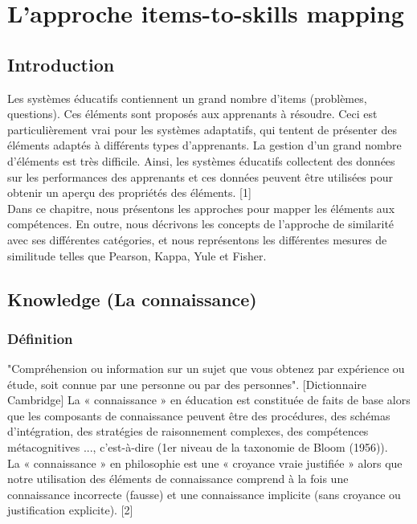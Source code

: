\chapter{L'approche items-to-skills mapping} 
\minitoc
\thispagestyle{empty}
\newpage
\section{Introduction}
Les systèmes éducatifs contiennent un grand nombre d'items (problèmes, questions). Ces éléments sont proposés aux apprenants à résoudre. Ceci est particulièrement vrai pour les systèmes adaptatifs, qui tentent de présenter des éléments adaptés à différents types d'apprenants. La gestion d’un grand nombre d’éléments est très difficile. Ainsi, les systèmes éducatifs collectent des données sur les performances des apprenants et ces données peuvent être utilisées pour obtenir un aperçu des propriétés des éléments. [1] \\
Dans ce chapitre, nous présentons les approches pour mapper les éléments aux compétences. En outre, nous décrivons les concepts de l'approche de similarité avec ses différentes catégories, et nous représentons les différentes mesures de similitude telles que Pearson, Kappa, Yule et Fisher.
\section{Knowledge (La connaissance)}
\subsection{Définition}
"Compréhension ou information sur un sujet que vous obtenez par expérience ou étude, soit connue par une personne ou par des personnes". [Dictionnaire Cambridge] La « connaissance » en éducation est constituée de faits de base alors que les composants de connaissance peuvent être des procédures, des schémas d'intégration, des stratégies de raisonnement complexes, des compétences métacognitives ..., c'est-à-dire (1er niveau de la taxonomie de Bloom (1956)). \\
La « connaissance » en philosophie est une « croyance vraie justifiée » alors que notre utilisation des éléments de connaissance comprend à la fois une connaissance incorrecte (fausse) et une connaissance implicite (sans croyance ou justification explicite). [2]

